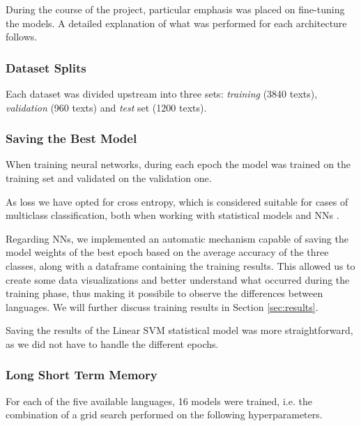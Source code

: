 \documentclass[letterpaper,11pt]{article}
\begin{document}
During the course of the project, particular emphasis was placed on fine-tuning the models. A detailed explanation of what was performed for each architecture follows.

\subsubsection*{Dataset Splits}

Each dataset was divided upstream into three sets: \textit{training} (3840 texts), \textit{validation} (960 texts) and \textit{test} set (1200 texts). 

\subsubsection*{Saving the Best Model}

When training neural networks, during each epoch the model was trained on the training set and validated on the validation one. 

As loss we have opted for cross entropy, which is considered suitable for cases of multiclass classification, both when working with statistical models and NNs \cite{cross_entropy}.

Regarding NNs, we implemented an automatic mechanism capable of saving the model weights of the best epoch based on the average accuracy of the three classes, along with a dataframe containing the training results. This allowed us to create some data visualizations and better understand what occurred during the training phase, thus making it possibile to observe the differences between languages. We will further discuss training results in Section \ref{sec:results}.

Saving the results of the Linear SVM statistical model was more straightforward, as we did not have to handle the different epochs.

\subsubsection*{Long Short Term Memory}

For each of the five available languages, 16 models were trained, i.e. the combination of a grid search performed on the following hyperparameters.
\end{document}
